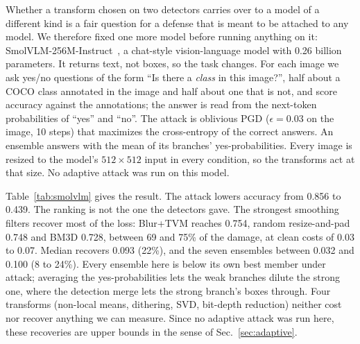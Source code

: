 \documentclass[11pt]{article}
\begin{document}
Whether a transform chosen on two detectors carries over to a model of a
different kind is a fair question for a defense that is meant to be attached
to any model. We therefore fixed one more model before running anything on
it: SmolVLM-256M-Instruct~\cite{marafioti2025smolvlm}, a chat-style vision-language model with 0.26
billion parameters. It returns text, not boxes, so the task changes. For
each image we ask yes/no questions of the form ``Is there a \emph{class} in
this image?'', half about a COCO class annotated in the image and half about
one that is not, and score accuracy against the annotations; the answer is
read from the next-token probabilities of ``yes'' and ``no''. The attack is
oblivious PGD ($\epsilon=0.03$ on the image, 10 steps) that maximizes the
cross-entropy of the correct answers. An ensemble answers with the mean of
its branches' yes-probabilities. Every image is resized to the model's
$512\times512$ input in every condition, so the transforms act at that
size. No adaptive attack was run on this model.

\begin{table}[t]
\centering\small
\caption{SmolVLM-256M, yes/no presence questions on the first 1{,}000
images (2{,}000 questions, 49.6\% with answer yes). Accuracy without a
defense: 0.856 clean, 0.439 under oblivious PGD. Clean cost is defended
minus undefended clean accuracy; recovery is defended minus undefended
attacked accuracy. Brackets are 95\% paired bootstrap intervals over images;
bold marks an interval that excludes zero. Sorted by attacked accuracy.}
\label{tab:smolvlm}
\end{table}

Table~\ref{tab:smolvlm} gives the result. The attack lowers accuracy from
0.856 to 0.439. The ranking is not the one the detectors gave. The strongest
smoothing filters recover most of the loss: Blur+TVM reaches 0.754,
random resize-and-pad 0.748 and BM3D 0.728, between 69 and 75\% of the
damage, at clean costs of 0.03 to 0.07. Median recovers 0.093 (22\%), and the
seven ensembles between 0.032 and 0.100 (8 to 24\%). Every ensemble here is
below its own best member under attack; averaging the yes-probabilities
lets the weak branches dilute the strong one, where the detection merge lets
the strong branch's boxes through. Four transforms (non-local means,
dithering, SVD, bit-depth reduction) neither cost nor recover anything we
can measure. Since no adaptive attack was run here, these recoveries are
upper bounds in the sense of Sec.~\ref{sec:adaptive}.
\end{document}
